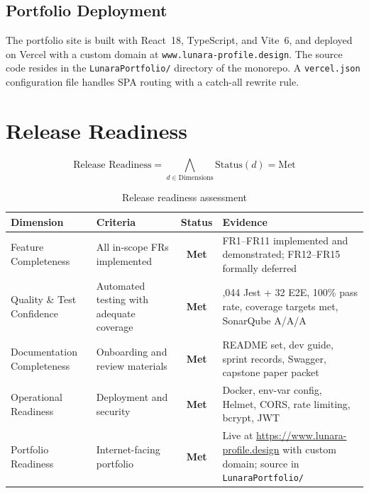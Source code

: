 \documentclass[12pt,letterpaper]{article}
\begin{document}
\subsection{Portfolio Deployment}

The portfolio site is built with React~18, TypeScript, and Vite~6, and deployed on Vercel with a custom domain at \texttt{www.lunara-profile.design}. The source code resides in the \texttt{LunaraPortfolio/} directory of the monorepo. A \texttt{vercel.json} configuration file handles SPA routing with a catch-all rewrite rule.

\newpage

\section{Release Readiness}

\[
\text{Release Readiness} = \bigwedge_{d \in \text{Dimensions}} \text{Status}(d) = \text{Met}
\]

\begin{table}[H]
\centering
\small
\begin{tabularx}{\textwidth}{|>{\raggedright\arraybackslash}p{2.8cm}|>{\raggedright\arraybackslash}X|c|>{\raggedright\arraybackslash}p{4.5cm}|}
\hline
\rowcolor{TableHeader}\textcolor{TableHeaderText}{\textbf{Dimension}} & \textcolor{TableHeaderText}{\textbf{Criteria}} & \textcolor{TableHeaderText}{\textbf{Status}} & \textcolor{TableHeaderText}{\textbf{Evidence}} \\
\hline
Feature Completeness & All in-scope FRs implemented & \textbf{Met} & FR1--FR11 implemented and demonstrated; FR12--FR15 formally deferred \\
\hline
\rowcolor{TableRowAlt}
Quality \& Test Confidence & Automated testing with adequate coverage & \textbf{Met} & 1,044 Jest + 32 E2E, 100\% pass rate, coverage targets met, SonarQube A/A/A \\
\hline
Documentation Completeness & Onboarding and review materials & \textbf{Met} & README set, dev guide, sprint records, Swagger, capstone paper packet \\
\hline
\rowcolor{TableRowAlt}
Operational Readiness & Deployment and security & \textbf{Met} & Docker, env-var config, Helmet, CORS, rate limiting, bcrypt, JWT \\
\hline
Portfolio Readiness & Internet-facing portfolio & \textbf{Met} & Live at \url{https://www.lunara-profile.design} with custom domain; source in \texttt{LunaraPortfolio/} \\
\hline
\end{tabularx}
\caption{Release readiness assessment}
\end{table}
\end{document}

